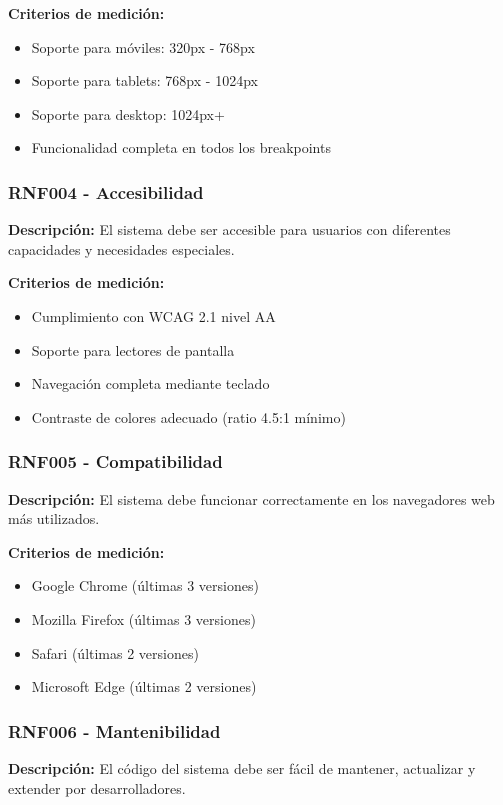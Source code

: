 \textbf{Criterios de medición:}
\begin{itemize}
    \item Soporte para móviles: 320px - 768px
    \item Soporte para tablets: 768px - 1024px
    \item Soporte para desktop: 1024px+
    \item Funcionalidad completa en todos los breakpoints
\end{itemize}

\subsubsection{RNF004 - Accesibilidad}
\textbf{Descripción:} El sistema debe ser accesible para usuarios con diferentes capacidades y necesidades especiales.

\textbf{Criterios de medición:}
\begin{itemize}
    \item Cumplimiento con WCAG 2.1 nivel AA
    \item Soporte para lectores de pantalla
    \item Navegación completa mediante teclado
    \item Contraste de colores adecuado (ratio 4.5:1 mínimo)
\end{itemize}

\subsubsection{RNF005 - Compatibilidad}
\textbf{Descripción:} El sistema debe funcionar correctamente en los navegadores web más utilizados.

\textbf{Criterios de medición:}
\begin{itemize}
    \item Google Chrome (últimas 3 versiones)
    \item Mozilla Firefox (últimas 3 versiones)
    \item Safari (últimas 2 versiones)
    \item Microsoft Edge (últimas 2 versiones)
\end{itemize}

\subsubsection{RNF006 - Mantenibilidad}
\textbf{Descripción:} El código del sistema debe ser fácil de mantener, actualizar y extender por desarrolladores.

